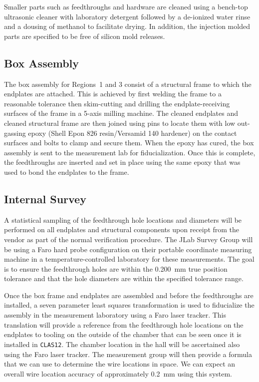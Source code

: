\documentclass[12pt]{article}
\begin{document}
Smaller parts such as feedthroughs and hardware are cleaned using a 
bench-top ultrasonic cleaner with laboratory detergent followed by a 
de-ionized water rinse and a dousing of methanol to facilitate drying. 
In addition, the injection molded parts are specified to be free of 
silicon mold releases.

\subsection{Box Assembly}

The box assembly for Regions~1 and 3 consist of a structural frame 
to which the endplates are attached. This is achieved by first welding 
the frame to a reasonable tolerance then skim-cutting and drilling the 
endplate-receiving surfaces of the frame in a 5-axis milling machine. 
The cleaned endplates and cleaned structural frame are then joined using 
pins to locate them with low out-gassing epoxy (Shell Epon 826 
resin/Versamid 140 hardener) on the contact surfaces and bolts to clamp 
and secure them. When the epoxy has cured, the box assembly is sent to 
the measurement lab for fiducialization. Once this is complete, the 
feedthroughs are inserted and set in place using the same epoxy that was 
used to bond the endplates to the frame.

\subsection{Internal Survey}
\label{internal}

A statistical sampling of the feedthrough hole locations and diameters 
will be performed on all endplates and structural components upon receipt 
from the vendor as part of the normal verification procedure.  The JLab
Survey Group will be using a Faro hard probe configuration on their portable 
coordinate measuring machine in a temperature-controlled laboratory for 
these measurements. The goal is to ensure the feedthrough holes are within 
the 0.200~mm true position tolerance and that the hole diameters are within 
the specified tolerance range. 

Once the box frame and endplates are assembled and before the feedthroughs 
are installed, a seven parameter least squares transformation is used to 
fiducialize the assembly in the measurement laboratory using a Faro laser 
tracker. This translation will provide a reference from the feedthrough hole 
locations on the endplates to tooling on the outside of the chamber that can 
be seen once it is installed in {\tt CLAS12}.  The chamber location in the hall 
will be ascertained also using the Faro laser tracker.  The measurement group 
will then provide a formula that we can use to determine the wire locations in 
space. We can expect an overall wire location accuracy of approximately 0.2~mm 
using this system.
\end{document}
